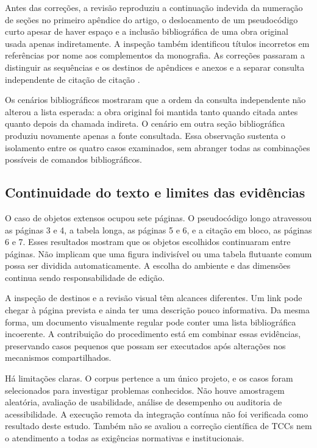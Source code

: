Antes das correções, a revisão reproduziu a continuação indevida da numeração
de seções no primeiro apêndice do artigo, o deslocamento de um pseudocódigo
curto apesar de haver espaço e a inclusão bibliográfica de uma obra original
usada apenas indiretamente. A inspeção também identificou títulos incorretos
em referências por nome aos complementos da monografia. As correções passaram
a distinguir as sequências e os destinos de apêndices e anexos e a separar
consulta independente de citação de citação .

Os cenários bibliográficos mostraram que a ordem da consulta independente
não alterou a lista esperada: a obra original foi mantida tanto quando citada
antes quanto depois da chamada indireta. O cenário em outra seção bibliográfica
produziu novamente apenas a fonte consultada. Essa observação sustenta o
isolamento entre os quatro casos examinados, sem abranger todas as combinações
possíveis de comandos bibliográficos.

\subsection{Continuidade do texto e limites das evidências}

O caso de objetos extensos ocupou sete páginas. O pseudocódigo longo
atravessou as páginas 3 e 4, a tabela longa, as páginas 5 e 6, e a citação
em bloco, as páginas 6 e 7. Esses resultados mostram que os objetos escolhidos
continuaram entre páginas. Não implicam que uma figura indivisível ou uma
tabela flutuante comum possa ser dividida automaticamente. A escolha do
ambiente e das dimensões continua sendo responsabilidade de edição.

A inspeção de destinos e a revisão visual têm alcances diferentes. Um link
pode chegar à página prevista e ainda ter uma descrição pouco informativa.
Da mesma forma, um documento visualmente regular pode conter uma lista
bibliográfica incoerente. A contribuição do procedimento está em combinar
essas evidências, preservando casos pequenos que possam ser executados após
alterações nos mecanismos compartilhados.

Há limitações claras. O corpus pertence a um único projeto, e os casos foram
selecionados para investigar problemas conhecidos. Não houve amostragem
aleatória, avaliação de usabilidade, análise de desempenho ou auditoria de
acessibilidade. A execução remota da integração contínua não foi verificada
como resultado deste estudo. Também não se avaliou a correção científica de
TCCs nem o atendimento a todas as exigências normativas e institucionais.

